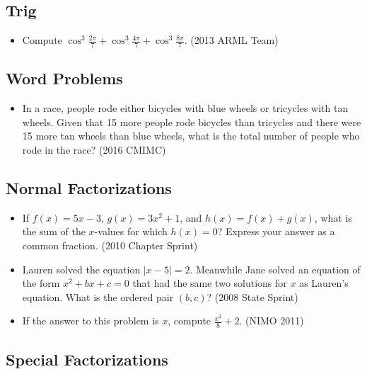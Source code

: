 \documentclass{article}
\begin{document}
\subsection{Trig}

\begin{itemize}

\item Compute $\cos^3\frac{2\pi}{7}+\cos^3\frac{4\pi}{7}+\cos^3\frac{8\pi}{7}$. (2013 ARML Team)

\end{itemize}


\subsection{Word Problems}

\begin{itemize}

\item In a race, people rode either bicycles with blue wheels or tricycles with tan wheels. Given that 15 more people rode bicycles than tricycles and there were 15 more tan wheels than blue wheels, what is the total number of people who rode in the race? (2016 CMIMC)

\end{itemize}


\subsection{Normal Factorizations}

\begin{itemize}

\item If $f(x)=5x-3$, $g(x)=3x^2+1$, and $h(x)=f(x)+g(x)$, what is the sum of the $x$-values for which $h(x)=0$? Express your answer as a common fraction. (2010 Chapter Sprint)

\item Lauren solved the equation $|x-5|=2$. Meanwhile Jane solved an equation of the form $x^2+bx+c=0$ that had the same two solutions for $x$ as Lauren's equation. What is the ordered pair $(b,c)$? (2008 State Sprint)

\item If the answer to this problem is $x$, compute $\frac{x^2}{8}+2$. (NIMO 2011)

\end{itemize}

\subsection{Special Factorizations}
\end{document}
